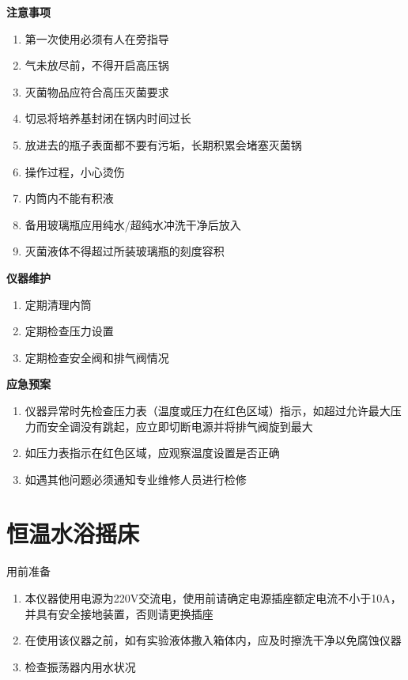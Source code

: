 \documentclass[
]{book}
\providecommand{\tightlist}{%
  \setlength{\itemsep}{0pt}\setlength{\parskip}{0pt}}
\begin{document}
\textbf{注意事项}

\begin{enumerate}
\def\labelenumi{\arabic{enumi}.}
\tightlist
\item
  第一次使用必须有人在旁指导
\item
  气未放尽前，不得开启高压锅
\item
  灭菌物品应符合高压灭菌要求
\item
  切忌将培养基封闭在锅内时间过长
\item
  放进去的瓶子表面都不要有污垢，长期积累会堵塞灭菌锅
\item
  操作过程，小心烫伤
\item
  内筒内不能有积液
\item
  备用玻璃瓶应用纯水/超纯水冲洗干净后放入
\item
  灭菌液体不得超过所装玻璃瓶的刻度容积
\end{enumerate}

\textbf{仪器维护}

\begin{enumerate}
\def\labelenumi{\arabic{enumi}.}
\tightlist
\item
  定期清理内筒
\item
  定期检查压力设置
\item
  定期检查安全阀和排气阀情况
\end{enumerate}

\textbf{应急预案}

\begin{enumerate}
\def\labelenumi{\arabic{enumi}.}
\tightlist
\item
  仪器异常时先检查压力表（温度或压力在红色区域）指示，如超过允许最大压力而安全调没有跳起，应立即切断电源并将排气阀旋到最大
\item
  如压力表指示在红色区域，应观察温度设置是否正确
\item
  如遇其他问题必须通知专业维修人员进行检修
\end{enumerate}

\hypertarget{ux6052ux6e29ux6c34ux6d74ux6447ux5e8a}{%
\section{恒温水浴摇床}\label{ux6052ux6e29ux6c34ux6d74ux6447ux5e8a}}

用前准备

\begin{enumerate}
\def\labelenumi{\arabic{enumi}.}
\tightlist
\item
  本仪器使用电源为220V交流电，使用前请确定电源插座额定电流不小于10A，并具有安全接地装置，否则请更换插座
\item
  在使用该仪器之前，如有实验液体撒入箱体内，应及时擦洗干净以免腐蚀仪器
\item
  检查振荡器内用水状况
\end{enumerate}
\end{document}
